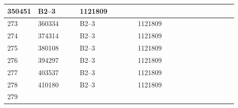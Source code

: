 \documentclass[UTF8,10pt,a4paper,fontset=fandol]{ctexart}
\newcommand{\fieldvalue}[1]{#1}
\begin{document}
\begin{center}
\begin{tabular}{|p{0.07\linewidth}|p{0.18\linewidth}|p{0.25\linewidth}|p{0.25\linewidth}|p{0.18\linewidth}|}
\fieldvalue{350451} &
\fieldvalue{B2--3} &
\fieldvalue{1121809} & \\ \hline
\fieldvalue{273} &
\fieldvalue{360334} &
\fieldvalue{B2--3} &
\fieldvalue{1121809} & \\ \hline
\fieldvalue{274} &
\fieldvalue{374314} &
\fieldvalue{B2--3} &
\fieldvalue{1121809} & \\ \hline
\fieldvalue{275} &
\fieldvalue{380108} &
\fieldvalue{B2--3} &
\fieldvalue{1121809} & \\ \hline
\fieldvalue{276} &
\fieldvalue{394297} &
\fieldvalue{B2--3} &
\fieldvalue{1121809} & \\ \hline
\fieldvalue{277} &
\fieldvalue{403537} &
\fieldvalue{B2--3} &
\fieldvalue{1121809} & \\ \hline
\fieldvalue{278} &
\fieldvalue{410180} &
\fieldvalue{B2--3} &
\fieldvalue{1121809} & \\ \hline
\fieldvalue{279} &

\end{tabular}
\end{center}
\end{document}

